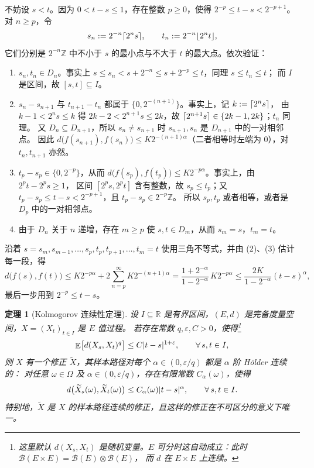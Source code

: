 \documentclass[UTF8,11pt,a4paper,oneside,fontset=fandol]{ctexrep}
\makeatletter
\numberwithin{equation}{section}
\theoremstyle{zhthm}
\newtheorem{theorem}{定理}[section]
\renewenvironment{proof}[1][\proofname]{\par
  \pushQED{\qed}%
  \normalfont\topsep6\p@\@plus6\p@\relax
  \trivlist
  \item[\hskip\labelsep\bfseries#1\hspace{0.5em}]\ignorespaces
}{%
  \popQED\endtrivlist\@endpefalse
}
\renewcommand{\proofname}{证明}
\newcommand{\Z}{\mathbb{Z}}
\newcommand{\R}{\mathbb{R}}
\newcommand{\B}{\mathcal{B}}
\DeclareMathOperator{\E}{\mathbb{E}}
\DeclarePairedDelimiter{\abs}{\lvert}{\rvert}
\DeclarePairedDelimiter{\ceil}{\lceil}{\rceil}
\DeclarePairedDelimiter{\floor}{\lfloor}{\rfloor}
\makeatother
\begin{document}
\begin{proof}
不妨设 $s<t$。因为 $0<t-s\le1$，存在整数 $p\ge0$，使得 $2^{-p}\le t-s<2^{-p+1}$。对 $n\ge p$，令
\[
  s_n:=2^{-n}\ceil{2^ns},\qquad t_n:=2^{-n}\floor{2^nt},
\]
它们分别是 $2^{-n}\Z$ 中不小于 $s$ 的最小点与不大于 $t$ 的最大点。依次验证：
\begin{enumerate}
  \item $s_n,t_n\in D_n$。事实上 $s\le s_n<s+2^{-n}\le s+2^{-p}\le t$，同理 $s\le t_n\le t$；
    而 $I$ 是区间，故 $[s,t]\subseteq I$。
  \item $s_n-s_{n+1}$ 与 $t_{n+1}-t_n$ 都属于 $\{0,2^{-(n+1)}\}$。事实上，记 $k:=\ceil{2^ns}$，
    由 $k-1<2^ns\le k$ 得 $2k-2<2^{n+1}s\le2k$，故 $\ceil{2^{n+1}s}\in\{2k-1,2k\}$；$t_n$ 同理。
    又 $D_n\subseteq D_{n+1}$，所以 $s_n\ne s_{n+1}$ 时 $s_{n+1},s_n$ 是 $D_{n+1}$ 中的一对相邻点。
    因此 $d\bigl(f(s_{n+1}),f(s_n)\bigr)\le K2^{-(n+1)\alpha}$（二者相等时左端为 $0$），对 $t_n,t_{n+1}$ 亦然。
  \item $t_p-s_p\in\{0,2^{-p}\}$，从而 $d\bigl(f(s_p),f(t_p)\bigr)\le K2^{-p\alpha}$。事实上，由 $2^pt-2^ps\ge1$，
    区间 $[2^ps,2^pt]$ 含有整数，故 $s_p\le t_p$；又 $t_p-s_p\le t-s<2^{-p+1}$，且 $t_p-s_p\in2^{-p}\Z$。
    所以 $s_p,t_p$ 或者相等，或者是 $D_p$ 中的一对相邻点。
  \item 由于 $D_n$ 关于 $n$ 递增，存在 $m\ge p$ 使 $s,t\in D_m$，从而 $s_m=s$，$t_m=t$。
\end{enumerate}
沿着 $s=s_m,s_{m-1},\ldots,s_p,t_p,t_{p+1},\ldots,t_m=t$ 使用三角不等式，并由 (2)、(3) 估计每一段，得
\[
  d\bigl(f(s),f(t)\bigr)
  \le K2^{-p\alpha}+2\sum_{n=p}^{\infty}K2^{-(n+1)\alpha}
  =\frac{1+2^{-\alpha}}{1-2^{-\alpha}}\,K2^{-p\alpha}
  \le\frac{2K}{1-2^{-\alpha}}(t-s)^\alpha,
\]
最后一步用到 $2^{-p}\le t-s$。
\end{proof}

\begin{theorem}[Kolmogorov 连续性定理]
\label{thm:kolmogorov-continuity}
设 $I\subseteq\R$ 是有界区间，$(E,d)$ 是完备度量空间，$X=(X_t)_{t\in I}$ 是 $E$ 值过程。
若存在常数 $q,\varepsilon,C>0$，使得\footnote{%
  这里默认 $d(X_s,X_t)$ 是随机变量。$E$ 可分时这自动成立：此时 $\B(E\times E)=\B(E)\otimes\B(E)$，
  而 $d$ 在 $E\times E$ 上连续。}
\begin{equation}
  \label{eq:kolmogorov-moment}
  \E\bigl[d(X_s,X_t)^q\bigr]\le C\abs{t-s}^{1+\varepsilon},\qquad\forall\,s,t\in I,
\end{equation}
则 $X$ 有一个修正 $\widetilde X$，其样本路径对每个 $\alpha\in(0,\varepsilon/q)$ 都是 $\alpha$ 阶 Hölder 连续的：
对任意 $\omega\in\Omega$ 及 $\alpha\in(0,\varepsilon/q)$，存在有限常数 $C_\alpha(\omega)$，使得
\[
  d\bigl(\widetilde X_s(\omega),\widetilde X_t(\omega)\bigr)\le C_\alpha(\omega)\abs{t-s}^\alpha,\qquad\forall\,s,t\in I.
\]
特别地，$\widetilde X$ 是 $X$ 的样本路径连续的修正，且这样的修正在不可区分的意义下唯一。
\end{theorem}
\end{document}

